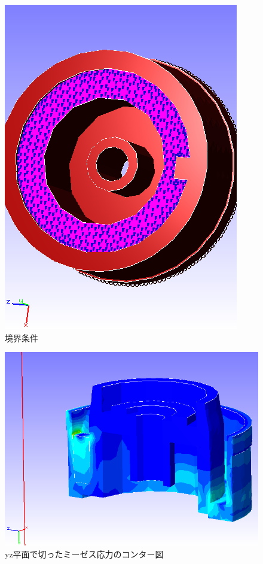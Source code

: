 \documentclass[a4paper,11pt]{jsarticle}
\begin{document}
\begin{figure}[h]
\begin{minipage}[b]{0.32\linewidth}
  \end{minipage}
  \begin{minipage}[b]{0.32\linewidth}
    \centering
    \includegraphics[scale=0.3]{cap_face08_dload.png}
  \end{minipage}
  \caption{境界条件}
\end{figure}
\begin{figure}[h]
  \centering
  \includegraphics[scale=0.3]{cap_yz_mises.png}
  \caption{yz平面で切ったミーゼス応力のコンター図}
\end{figure}
\end{document}
